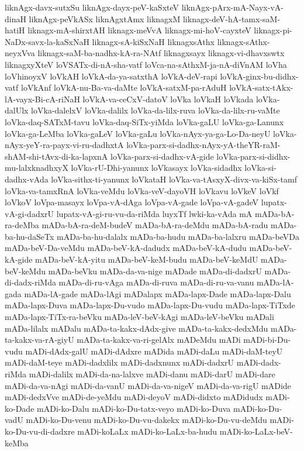 {liknAgx-davx-sutxSu
liknAgx-dayx-peV-kaSxteV
liknAgx-pArx-mA-Nayx-vA-dinaH
liknAgx-peVkASx
liknAgxtAmx
liknagxM
liknagx-deV-hA-tamx-saM-hatiH
liknagx-mA-shirxtAH
liknagx-meVvA
liknagx-mi-hoV-cayxteV
liknagx-pi-NaDx-savx-la-kaSxNaH
liknagx-sA-kiSxNaH
liknagxsAthx
liknagx-sAthx-neyxVva
liknagx-saM-ba-nadhx-kA-ra-NAtf
liknagxsayx
liknagx-vi-dhavxswtx
liknagxyXteV
loVSATx-di-nA-sha-vatf
loVca-na-sAthxM-ja-nA-diVnAM
loVha
loVhinoyxV
loVkAH
loVkA-da-ya-satxthA
loVkA-deV-rapi
loVkA-ginx-bu-didhx-vatf
loVkAnf
loVkA-nu-Ba-va-daMte
loVkA-satxM-pa-rAduH
loVkA-satx-tAkx-lA-vayx-Bi-cA-riNaH
loVkA-va-ceCxV-datoV
loVka
loVkaH
loVkada
loVka-dalUlx
loVka-dalelxV
loVka-dalilx
loVka-da-lilx-ruva
loVka-da-lilx-ru-vaMte
loVka-daq-SATxM-tavu
loVka-daq-SiTx-yiMda
loVka-gaLU
loVka-ga-Lanunx
loVka-ga-LeMba
loVka-gaLeV
loVka-gaLu
loVka-nAyx-ya-ga-Lo-Da-neyU
loVka-nAyx-yeY-ra-payx-vi-ru-dadhxtA
loVka-parx-si-dadhx-nAyx-yA-theYR-raM-shAM-shi-tAvx-di-ka-lapxnA
loVka-parx-si-dadhx-vA-gide
loVka-parx-si-didhx-mu-lalxknadhxyX
loVka-rU-Dhi-yanunx
loVkasayx
loVka-sidadhx
loVka-si-dadhx-vAda
loVka-sithx-ti-yanunx
loVkataH
loVka-va-tAsxyX-divx-va-kiSx-tamf
loVka-va-tamxRnA
loVka-veMdu
loVka-veV-dayoVH
loVkavu
loVkeV
loVkf
loVkoV
loVpa-masayx
loVpa-vA-dAga
loVpa-vA-gade
loVpa-vA-gadeV
lupatx-vA-gi-dadxrU
lupatx-vA-gi-ru-vu-da-riMda
luyxTf
lwki-ka-vAda
mA
mADa-bA-ra-deMba
mADa-bA-ra-deM-budeV
mADa-bA-ra-deMdu
mADa-bA-radu
mADa-ba-hu-daSeTx
mADa-ba-hu-dalalx
mADa-ba-hudu
mADa-ba-lalxru
mADa-beVDa
mADa-beV-Da-veMdu
mADa-beV-kA-dadudx
mADa-beV-kA-dudu
mADa-beV-kA-gide
mADa-beV-kA-yitu
mADa-beV-keM-budu
mADa-beV-keMdU
mADa-beV-keMdu
mADa-beVku
mADa-da-va-nige
mADade
mADa-di-dadxrU
mADa-di-dadx-riMda
mADa-di-ru-vAga
mADa-di-ruva
mADa-di-ru-va-vanu
mADa-lA-gada
mADa-lA-gade
mADa-lAgi
mADalapx
mADa-lapx-Dade
mADa-lapx-Dalu
mADa-lapx-Duva
mADa-lapx-Du-vudo
mADa-lapx-Du-vudu
mADa-lapx-TiTxde
mADa-lapx-TiTx-ra-beVku
mADa-leV-beV-kAgi
mADa-leV-beVku
mADali
mADa-lilalx
mADalu
mADa-ta-kakx-dAdx-give
mADa-ta-kakx-dedxMdu
mADa-ta-kakx-va-rA-giyU
mADa-ta-kakx-va-ri-gelAlx
mADeMdu
mADi
mADi-bi-Du-vudu
mADi-dAdx-galU
mADi-dAdxre
mADida
mADi-daLu
mADi-daM-teyU
mADi-daM-teye
mADi-dadxlilx
mADi-dadxnunx
mADi-dadxrU
mADi-dadx-riMda
mADi-dalilx
mADi-da-na-lalxve
mADi-danu
mADi-darU
mADi-dare
mADi-da-va-nAgi
mADi-da-vanU
mADi-da-va-nigeV
mADi-da-va-rigU
mADide
mADi-dedxVve
mADi-de-yeMdu
mADi-deyoV
mADi-didxto
mADidudx
mADi-ko-Dade
mADi-ko-Dalu
mADi-ko-Du-tatx-veyo
mADi-ko-Duva
mADi-ko-Du-vadU
mADi-ko-Du-venu
mADi-ko-Du-vu-dakekx
mADi-ko-Du-vu-deMdu
mADi-ko-Du-vu-di-dadxre
mADi-koLaLx
mADi-ko-LaLx-ba-hudu
mADi-ko-LaLx-beV-keMba
}
